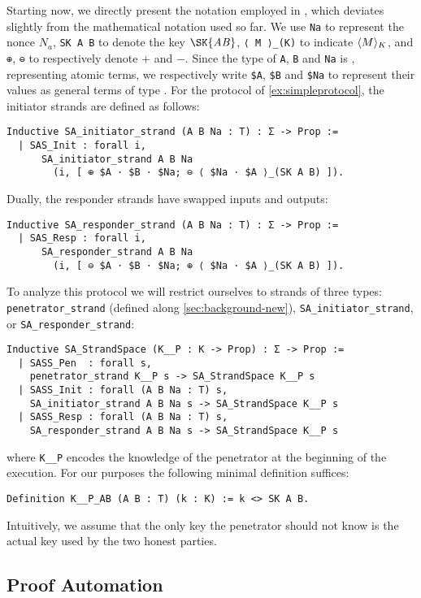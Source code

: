 Starting now, we directly present the notation employed in \easystrands, which deviates slightly from the mathematical notation used so far.
We use \lstinline{Na} to represent the nonce $N_a$, \lstinline{SK A B} to denote the key $\mathit{\SK{AB}}$, \lstinline{⟨ M ⟩_(K)} to indicate ${\langle M \rangle _{K}}$, and \lstinline{⊕}, \lstinline{⊖} to respectively denote $+$ and $-$.
Since the type of \lstinline{A}, \lstinline{B} and \lstinline{Na} is \T, representing atomic terms, we respectively write \lstinline{$A}, \lstinline{$B} and \lstinline{$Na} to represent their values as general terms of type \terms.
For the protocol of \cref{ex:simpleprotocol},
the initiator strands are defined as follows:
\begin{lstlisting}
Inductive SA_initiator_strand (A B Na : T) : Σ -> Prop :=
  | SAS_Init : forall i,
      SA_initiator_strand A B Na
        (i, [ ⊕ $A ⋅ $B ⋅ $Na; ⊖ ⟨ $Na ⋅ $A ⟩_(SK A B) ]).
\end{lstlisting}
Dually, the responder strands have swapped inputs and outputs:
\begin{lstlisting}
Inductive SA_responder_strand (A B Na : T) : Σ -> Prop :=
  | SAS_Resp : forall i,
      SA_responder_strand A B Na
        (i, [ ⊖ $A ⋅ $B ⋅ $Na; ⊕ ⟨ $Na ⋅ $A ⟩_(SK A B) ]).
\end{lstlisting}
To analyze this protocol we will restrict ourselves to strands of three types: \lstinline{penetrator_strand} (defined along \cref{sec:background-new}), \lstinline{SA_initiator_strand}, or \lstinline{SA_responder_strand}:
\begin{lstlisting}
Inductive SA_StrandSpace (K__P : K -> Prop) : Σ -> Prop :=
  | SASS_Pen  : forall s,
    penetrator_strand K__P s -> SA_StrandSpace K__P s
  | SASS_Init : forall (A B Na : T) s,
    SA_initiator_strand A B Na s -> SA_StrandSpace K__P s
  | SASS_Resp : forall (A B Na : T) s,
    SA_responder_strand A B Na s -> SA_StrandSpace K__P s
\end{lstlisting}
where \lstinline|K__P| encodes the knowledge of the penetrator at the beginning of the execution.
For our purposes the following minimal definition suffices:
\begin{lstlisting}
Definition K__P_AB (A B : T) (k : K) := k <> SK A B.
\end{lstlisting}
Intuitively, we assume that the only key the penetrator should not know is the actual key used by the two honest parties.





\subsection{Proof Automation}
\label{sec:proofprotocol}

